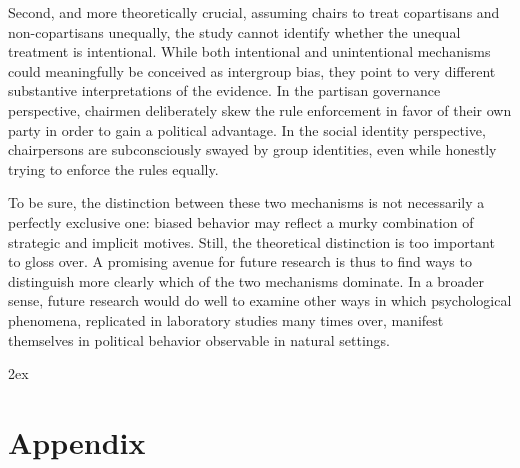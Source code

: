 \documentclass[12pt,a4paper]{article}
\begin{document}
Second, and more theoretically crucial, assuming chairs to treat copartisans and non-copartisans unequally, the study cannot identify whether the unequal treatment is intentional. While both intentional and unintentional mechanisms could meaningfully be conceived as intergroup bias, they point to very different substantive interpretations of the evidence. In the partisan governance perspective, chairmen deliberately skew the rule enforcement in favor of their own party in order to gain a political advantage. In the social identity perspective, chairpersons are subconsciously swayed by group identities, even while honestly trying to enforce the rules equally.

To be sure, the distinction between these two mechanisms is not necessarily a perfectly exclusive one: biased behavior may reflect a murky combination of strategic and implicit motives. Still, the theoretical distinction is too important to gloss over. A promising avenue for future research is thus to find ways to distinguish more clearly which of the two mechanisms dominate. In a broader sense, future research would do well to examine other ways in which psychological phenomena, replicated in laboratory studies many times over, manifest themselves in political behavior observable in natural settings.



\newpage
\begingroup
\parindent 0pt
\parskip 2ex
\def\enotesize{\normalsize}
\endgroup

\clearpage






\clearpage

\appendix

\section{Appendix}
\end{document}
